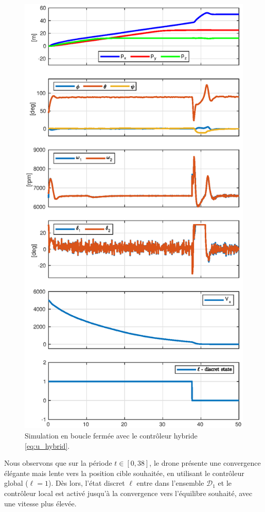 \begin{figure}[ht!]
    \centering
    \includegraphics[trim=0cm 0cm 0cm 1.1cm,clip,width=0.8\columnwidth]{figures/switch_paper2.eps}
    \caption{Simulation en boucle fermée avec le contrôleur hybride \eqref{eq:u_hybrid}.}
    \label{fig_sim}
\end{figure}

Nous observons que sur la période $t \in \left[0,38\right]$, le drone
présente une convergence élégante mais lente vers la position cible souhaitée, en utilisant le contrôleur global ($\ell=1$). Dès lors, l'état discret $\ell$ entre dans l'ensemble $\mathcal{D}_1$ et le contrôleur local est activé jusqu'à la convergence vers l'équilibre souhaité, avec une vitesse plus élevée.

